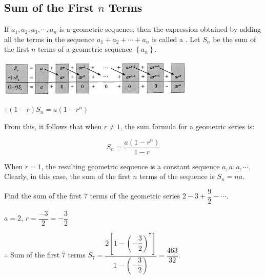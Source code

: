 \documentclass{report}
\begin{document}
        \subsection*{Sum of the First \(n\) Terms}

        If $a_{1}, a_{2}, a_{3}, \cdots, a_{n}$ is a geometric sequence, then the expression obtained by adding all the terms in the sequence $a_{1}+a_{2}+\cdots+a_{n}$ is called a . Let $S_{n}$ be the sum of the first $n$ terms of a geometric sequence $\left\{a_{n}\right\}$.
        \vspace{-1em}
        \begin{center}
            \includegraphics[width=0.7\textwidth]{assets/13-7.jpg}
        \end{center}
        \vspace{-1em}
        $\therefore(1-r) S_{n}=a\left(1-r^{n}\right)$
        
        From this, it follows that when $r \neq 1$, the sum formula for a geometric series is:
        \begin{info}
            $$
            S_{n}=\dfrac{a(1-r^{n})}{1-r}
            $$
        \end{info}
        
        When $r=1$, the resulting geometric sequence is a constant sequence $a, a, a, \cdots$. Clearly, in this case, the sum of the first $n$ terms of the sequence is $S_{n}=n a$.
        
        \begin{question}
            Find the sum of the first $7$ terms of the geometric series $2-3+\dfrac{9}{2}-\cdots$.

            \sol{}

            \noindent $a = 2$, $r = \dfrac{-3}{2} = -\dfrac{3}{2}$

            \vspace{-1em}
            \noindent $\therefore$ Sum of the first $7$ terms $S_{7}=\dfrac{2\left[1-\left(-\dfrac{3}{2}\right)^{7}\right]}{1-\left(-\dfrac{3}{2}\right)}=\dfrac{463}{32}$.
        \end{question}
\end{document}
